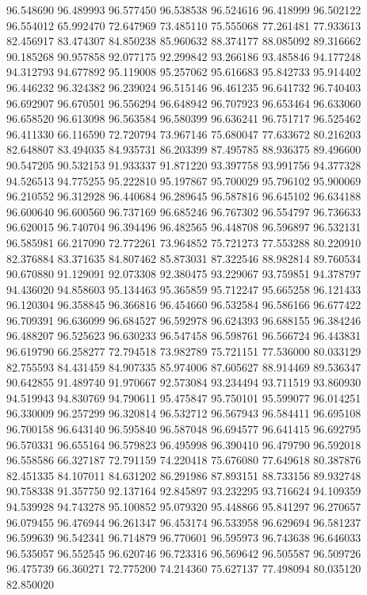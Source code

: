 96.548690
96.489993
96.577450
96.538538
96.524616
96.418999
96.502122
96.554012
65.992470
72.647969
73.485110
75.555068
77.261481
77.933613
82.456917
83.474307
84.850238
85.960632
88.374177
88.085092
89.316662
90.185268
90.957858
92.077175
92.299842
93.266186
93.485846
94.177248
94.312793
94.677892
95.119008
95.257062
95.616683
95.842733
95.914402
96.446232
96.324382
96.239024
96.515146
96.461235
96.641732
96.740403
96.692907
96.670501
96.556294
96.648942
96.707923
96.653464
96.633060
96.658520
96.613098
96.563584
96.580399
96.636241
96.751717
96.525462
96.411330
66.116590
72.720794
73.967146
75.680047
77.633672
80.216203
82.648807
83.494035
84.935731
86.203399
87.495785
88.936375
89.496600
90.547205
90.532153
91.933337
91.871220
93.397758
93.991756
94.377328
94.526513
94.775255
95.222810
95.197867
95.700029
95.796102
95.900069
96.210552
96.312928
96.440684
96.289645
96.587816
96.645102
96.634188
96.600640
96.600560
96.737169
96.685246
96.767302
96.554797
96.736633
96.620015
96.740704
96.394496
96.482565
96.448708
96.596897
96.532131
96.585981
66.217090
72.772261
73.964852
75.721273
77.553288
80.220910
82.376884
83.371635
84.807462
85.873031
87.322546
88.982814
89.760534
90.670880
91.129091
92.073308
92.380475
93.229067
93.759851
94.378797
94.436020
94.858603
95.134463
95.365859
95.712247
95.665258
96.121433
96.120304
96.358845
96.366816
96.454660
96.532584
96.586166
96.677422
96.709391
96.636099
96.684527
96.592978
96.624393
96.688155
96.384246
96.488207
96.525623
96.630233
96.547458
96.598761
96.566724
96.443831
96.619790
66.258277
72.794518
73.982789
75.721151
77.536000
80.033129
82.755593
84.431459
84.907335
85.974006
87.605627
88.914469
89.536347
90.642855
91.489740
91.970667
92.573084
93.234494
93.711519
93.860930
94.519943
94.830769
94.790611
95.475847
95.750101
95.599077
96.014251
96.330009
96.257299
96.320814
96.532712
96.567943
96.584411
96.695108
96.700158
96.643140
96.595840
96.587048
96.694577
96.641415
96.692795
96.570331
96.655164
96.579823
96.495998
96.390410
96.479790
96.592018
96.558586
66.327187
72.791159
74.220418
75.676080
77.649618
80.387876
82.451335
84.107011
84.631202
86.291986
87.893151
88.733156
89.932748
90.758338
91.357750
92.137164
92.845897
93.232295
93.716624
94.109359
94.539928
94.743278
95.100852
95.079320
95.448866
95.841297
96.270657
96.079455
96.476944
96.261347
96.453174
96.533958
96.629694
96.581237
96.599639
96.542341
96.714879
96.770601
96.595973
96.743638
96.646033
96.535057
96.552545
96.620746
96.723316
96.569642
96.505587
96.509726
96.475739
66.360271
72.775200
74.214360
75.627137
77.498094
80.035120
82.850020

